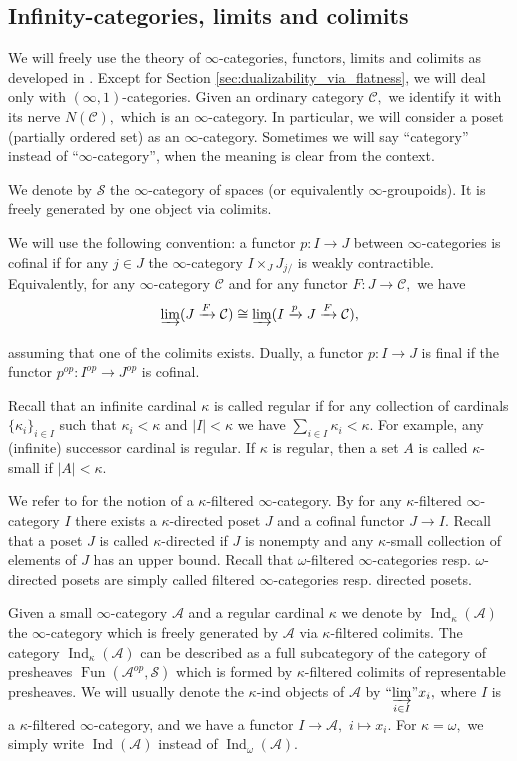 \documentclass[11pt,leqno]{amsart}
\numberwithin{equation}{section}
\newcommand{\indlim}[1][]{\mathop{\varinjlim}\limits_{#1}}
\newcommand{\inddlim}[1][]{{``{\indlim[#1]}"}}
\newcommand{\xto}{\xrightarrow}
\newcommand{\cA}{{\mathcal A}}
\newcommand{\cC}{{\mathcal C}}
\newcommand{\cS}{{\mathcal S}}
\newcommand{\Fun}{\operatorname{Fun}}
\newcommand{\Ind}{\operatorname{Ind}}
\begin{document}
\subsection{Infinity-categories, limits and colimits}

We will freely use the theory of $\infty$-categories, functors, limits and colimits as developed in \cite{Lur09, Lur17}. Except for Section \ref{sec:dualizability_via_flatness}, we will deal only with $(\infty,1)$-categories. Given an ordinary category $\cC,$ we identify it with its nerve $N(\cC),$ which is an $\infty$-category. In particular, we will consider a poset (partially ordered set) as an $\infty$-category. Sometimes we will say ``category'' instead of ``$\infty$-category'', when the meaning is clear from the context.

We denote by $\cS$ the $\infty$-category of spaces (or equivalently $\infty$-groupoids). It is freely generated by one object via colimits.

We will use the following convention: a functor $p:I\to J$ between $\infty$-categories is cofinal if for any $j\in J$ the $\infty$-category $I\times_J J_{j/}$ is weakly contractible. Equivalently, for any $\infty$-category $\cC$ and for any functor $F:J\to\cC,$
we have
$$\indlim[](J\xto{F}\cC)\cong\indlim[](I\xto{p}J\xto{F}\cC),$$
assuming that one of the colimits exists. Dually, a functor $p:I\to J$ is final if the functor $p^{op}:I^{op}\to J^{op}$ is cofinal.    

Recall that an infinite cardinal $\kappa$ is called regular if for any collection of cardinals $\{\kappa_i\}_{i\in I}$ such that $\kappa_i<\kappa$ and $|I|<\kappa$ we have $\sum\limits_{i\in I}\kappa_i<\kappa.$ For example, any (infinite) successor cardinal is regular.
If $\kappa$ is regular, then a set $A$ is called $\kappa$-small if $|A|<\kappa.$ 

We refer to \cite[Definition 5.3.1.7]{Lur09} for the notion of a $\kappa$-filtered $\infty$-category. By \cite[Proposition 5.3.1.18]{Lur09} for any $\kappa$-filtered $\infty$-category $I$ there exists a $\kappa$-directed poset $J$ and a cofinal functor $J\to I.$ Recall that a poset $J$ is called $\kappa$-directed if $J$ is nonempty and any $\kappa$-small collection of elements of $J$ has an upper bound. Recall that $\omega$-filtered $\infty$-categories resp. $\omega$-directed posets are simply called filtered $\infty$-categories resp. directed posets.

Given a small $\infty$-category $\cA$ and a regular cardinal $\kappa$ we denote by $\Ind_{\kappa}(\cA)$ the $\infty$-category which is freely generated by $\cA$ via $\kappa$-filtered colimits. The category $\Ind_{\kappa}(\cA)$ can be described as a full subcategory of the category of presheaves $\Fun(\cA^{op},\cS)$ which is formed by $\kappa$-filtered colimits of representable presheaves. We will usually denote the $\kappa$-ind objects of $\cA$ by $\inddlim[i\in I]x_i,$ where $I$ is a $\kappa$-filtered $\infty$-category, and we have a functor $I\to\cA,$ $i\mapsto x_i.$ For $\kappa=\omega,$ we simply write $\Ind(\cA)$ instead of $\Ind_{\omega}(\cA).$ 
\end{document}

